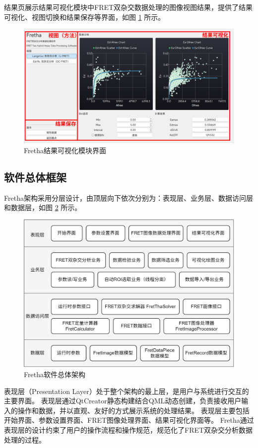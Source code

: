 结果页展示结果可视化模块中FRET双杂交数据处理的图像视图结果，提供了结果可视化、视图切换和结果保存等界面，如图 \ref{fig:Fretha结果可视化模块界面} 所示。
\begin{figure}[hbtp]
  \centering
  \includegraphics[width=0.9\linewidth]{../figures/2/Fretha界面-结果展示.drawio.png}
  \caption{Fretha结果可视化模块界面}
  \label{fig:Fretha结果可视化模块界面}
\end{figure}

\subsection{软件总体框架}

Fretha架构采用分层设计，由顶层向下依次分别为：表现层、业务层、数据访问层和数据层，如图 \ref{fig:fretha_arch} 所示。
\begin{figure}[hbtp]
    \centering
    \includegraphics[width=0.9\linewidth]{../figures/2/Fretha总体架构图.drawio.png}
    \caption{Fretha软件总体架构}
    \label{fig:fretha_arch}
\end{figure}

表现层（Presentation Layer）处于整个架构的最上层，是用户与系统进行交互的主要界面。
表现层通过QtCreator静态构建结合QML动态创建，负责接收用户输入的操作和数据，并以直观、友好的方式展示系统的处理结果。
表现层主要包括开始界面、参数设置界面、FRET图像处理界面、结果可视化界面等。
Fretha通过表现层的设计约束了用户的操作流程和操作规范，规范化了FRET双杂交分析数据处理的过程。

